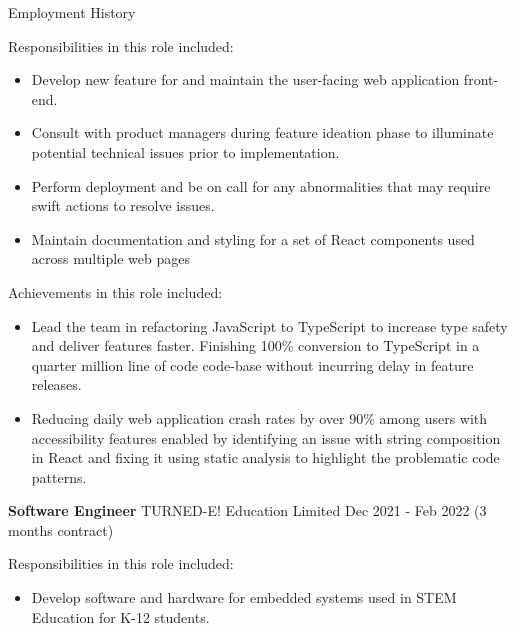 \documentclass{resume} %
\begin{document}
\begin{rSection}{Employment History}
    \hspace*{1cm}%
    \begin{minipage}{.8\textwidth}%
        
        Responsibilities in this role included:
        \begin{itemize}
            \item Develop new feature for and maintain the user-facing web application front-end.
            \item Consult with product managers during feature ideation phase to illuminate potential technical issues prior to implementation.
            \item Perform deployment and be on call for any abnormalities that may require swift actions to resolve issues.
            \item Maintain documentation and styling for a set of React components used across multiple web pages
        \end{itemize}
        
        Achievements in this role included:
        \begin{itemize}
            \item Lead the team in refactoring JavaScript to TypeScript to increase type safety and deliver features faster. Finishing 100\% conversion to TypeScript in a quarter million line of code code-base without incurring delay in feature releases.
            \item Reducing daily web application crash rates by over 90\% among users with accessibility features enabled by identifying an issue with string composition in React and fixing it using static analysis to highlight the problematic code patterns.
        \end{itemize}
    \end{minipage}%
    \clearpage
    \item \textbf{Software Engineer} {TURNED-E! Education Limited} \hfill Dec 2021 - Feb 2022 (3 months contract) \\
    
    \hspace*{1cm}%
    \begin{minipage}{.8\textwidth}%
        
        Responsibilities in this role included:
        \begin{itemize}
            \item Develop software and hardware for embedded systems used in STEM Education for K-12 students.
        \end{itemize}
        

\end{minipage}
\end{rSection}
\end{document}
